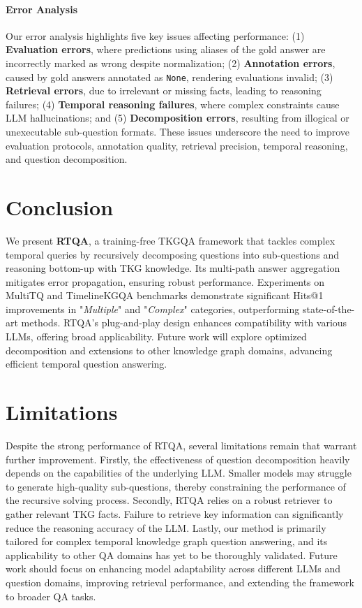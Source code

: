 \documentclass[11pt]{article}
\begin{document}
\paragraph{Error Analysis}
Our error analysis highlights five key issues affecting performance: (1) \textbf{Evaluation errors}, where predictions using aliases of the gold answer are incorrectly marked as wrong despite normalization; (2) \textbf{Annotation errors}, caused by gold answers annotated as \texttt{None}, rendering evaluations invalid; (3) \textbf{Retrieval errors}, due to irrelevant or missing facts, leading to reasoning failures; (4) \textbf{Temporal reasoning failures}, where complex constraints cause LLM hallucinations; and (5) \textbf{Decomposition errors}, resulting from illogical or unexecutable sub-question formats. These issues underscore the need to improve evaluation protocols, annotation quality, retrieval precision, temporal reasoning, and question decomposition.



\section{Conclusion}
We present \textbf{RTQA}, a training-free TKGQA framework that tackles complex temporal queries by recursively decomposing questions into sub-questions and reasoning bottom-up with TKG knowledge. Its multi-path answer aggregation mitigates error propagation, ensuring robust performance. Experiments on MultiTQ and TimelineKGQA benchmarks demonstrate significant Hits@1 improvements in "\textit{Multiple}" and "\textit{Complex}" categories, outperforming state-of-the-art methods. RTQA’s plug-and-play design enhances compatibility with various LLMs, offering broad applicability. Future work will explore optimized decomposition and extensions to other knowledge graph domains, advancing efficient temporal question answering.



\section*{Limitations}
Despite the strong performance of RTQA, several limitations remain that warrant further improvement. Firstly, the effectiveness of question decomposition heavily depends on the capabilities of the underlying LLM. Smaller models may struggle to generate high-quality sub-questions, thereby constraining the performance of the recursive solving process. Secondly, RTQA relies on a robust retriever to gather relevant TKG facts. Failure to retrieve key information can significantly reduce the reasoning accuracy of the LLM. Lastly, our method is primarily tailored for complex temporal knowledge graph question answering, and its applicability to other QA domains has yet to be thoroughly validated. Future work should focus on enhancing model adaptability across different LLMs and question domains, improving retrieval performance, and extending the framework to broader QA tasks.
\end{document}
